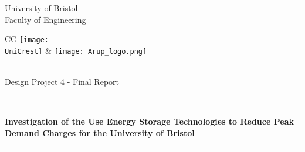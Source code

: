 \documentclass[fontsize=9.5pt]{extarticle}
\numberwithin{figure}{section} %
\newcommand{\AssignmentTitle}{Investigation of the Use Energy Storage Technologies to Reduce Peak Demand Charges for the University of Bristol}
\newcommand{\ModuleTitle}{Design Project 4 - Final Report}
\newcommand{\University}{University of Bristol}
\newcommand{\Faculty}{Faculty of Engineering}
\newcommand{\UniCrest}{crestbris.png}
\newcommand{\horrule}[1]{\rule{\linewidth}{#1}}
\begin{document}
  \setlength{\abovedisplayskip}{-18pt}
  \setlength{\belowdisplayskip}{0pt}
  \setlength{\abovedisplayshortskip}{-18pt}
  \setlength{\belowdisplayshortskip}{0pt}



\begin{titlepage}

	\center %
		\normalfont \normalsize \University \\ [10pt]
		\normalfont \normalsize \Faculty \\ [25pt]
\begin{tabular}{CC}
  \texttt{[image: \\UniCrest]} &   \texttt{[image: Arup\_logo.png]}
\end{tabular}\\[0.5cm]
		\normalfont \normalsize \ModuleTitle \\ [25pt]
		\horrule{0.5pt} \\[0.4cm]
		\huge \textbf{\AssignmentTitle} \\
		\horrule{2pt} \\[0.5cm]

\end{titlepage}
\end{document}
